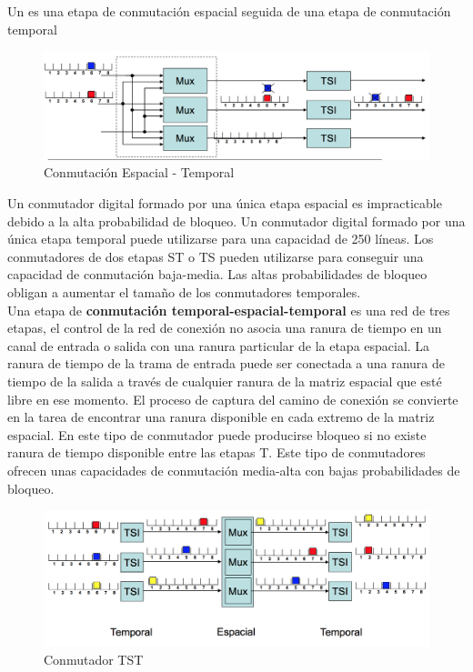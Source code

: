 \documentclass[10pt,portrait, twocolumn]{article}
\begin{document}
Un  es una etapa de conmutación espacial seguida de una etapa de conmutación temporal
	
	\begin{figure}[!ht]
 		\centering
  		 \includegraphics[scale = 0.4]{images/ST}
		\caption{Conmutación Espacial - Temporal}
	\end{figure}

Un conmutador digital formado por una única etapa espacial es impracticable debido a la alta probabilidad de bloqueo. Un conmutador digital formado por una única etapa temporal puede utilizarse para una capacidad de 250 líneas. Los conmutadores de dos etapas ST o TS pueden utilizarse para conseguir una capacidad de conmutación baja-media. Las altas probabilidades de bloqueo obligan a aumentar el tamaño de los conmutadores temporales.\\

Una etapa de \textbf{conmutación temporal-espacial-temporal} es una red de tres etapas, el control de la red de conexión no asocia una ranura de tiempo en un canal de entrada o salida con una ranura particular de la etapa espacial. La ranura de tiempo de la trama de entrada puede ser conectada a una ranura de tiempo de la salida a través de cualquier ranura de la matriz espacial que esté libre en ese momento. El proceso de captura del camino de conexión se convierte en la tarea de encontrar una ranura disponible en cada extremo de la matriz espacial. En este tipo de conmutador puede producirse bloqueo si no existe ranura de tiempo disponible entre las etapas T. Este tipo de conmutadores ofrecen unas capacidades de conmutación media-alta con bajas probabilidades de bloqueo.

	\begin{figure}[!ht]
 		\centering
  		 \includegraphics[scale = 0.4]{images/TST}
		\caption{Conmutador TST}
	\end{figure}
\end{document}
